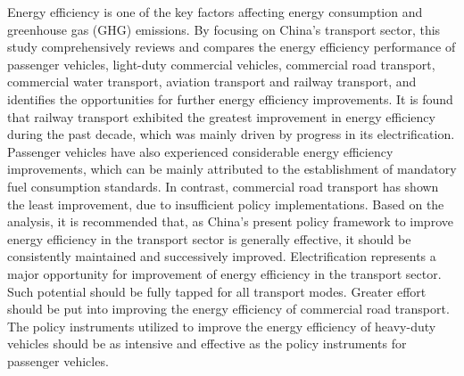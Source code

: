 Energy efficiency is one of the key factors affecting energy consumption and greenhouse gas (GHG) emissions. By focusing on China’s transport sector, this study comprehensively reviews and compares the energy efficiency performance of passenger vehicles, light-duty commercial vehicles, commercial road transport, commercial water transport, aviation transport and railway transport, and identifies the opportunities for further energy efficiency improvements. It is found that railway transport exhibited the greatest improvement in energy efficiency during the past decade, which was mainly driven by progress in its electrification. Passenger vehicles have also experienced considerable energy efficiency improvements, which can be mainly attributed to the establishment of mandatory fuel consumption standards. In contrast, commercial road transport has shown the least improvement, due to insufficient policy implementations. Based on the analysis, it is recommended that, as China’s present policy framework to improve energy efficiency in the transport sector is generally effective, it should be consistently maintained and successively improved. Electrification represents a major opportunity for improvement of energy efficiency in the transport sector. Such potential should be fully tapped for all transport modes. Greater effort should be put into improving the energy efficiency of commercial road transport. The policy instruments utilized to improve the energy efficiency of heavy-duty vehicles should be as intensive and effective as the policy instruments for passenger vehicles.